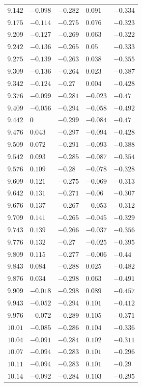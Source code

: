 \begin{table}[h]
\begin{tabular}{rllll}
$9.142$&$-0.098$&$-0.282$&$0.091$&$-0.334$\\
$9.175$&$-0.114$&$-0.275$&$0.076$&$-0.323$\\
$9.209$&$-0.127$&$-0.269$&$0.063$&$-0.322$\\
$9.242$&$-0.136$&$-0.265$&$0.05$&$-0.333$\\
$9.275$&$-0.139$&$-0.263$&$0.038$&$-0.355$\\
$9.309$&$-0.136$&$-0.264$&$0.023$&$-0.387$\\
$9.342$&$-0.124$&$-0.27$&$0.004$&$-0.428$\\
$9.376$&$-0.099$&$-0.281$&$-0.023$&$-0.47$\\
$9.409$&$-0.056$&$-0.294$&$-0.058$&$-0.492$\\
$9.442$&$0$&$-0.299$&$-0.084$&$-0.47$\\
$9.476$&$0.043$&$-0.297$&$-0.094$&$-0.428$\\
$9.509$&$0.072$&$-0.291$&$-0.093$&$-0.388$\\
$9.542$&$0.093$&$-0.285$&$-0.087$&$-0.354$\\
$9.576$&$0.109$&$-0.28$&$-0.078$&$-0.328$\\
$9.609$&$0.121$&$-0.275$&$-0.069$&$-0.313$\\
$9.642$&$0.131$&$-0.271$&$-0.06$&$-0.307$\\
$9.676$&$0.137$&$-0.267$&$-0.053$&$-0.312$\\
$9.709$&$0.141$&$-0.265$&$-0.045$&$-0.329$\\
$9.743$&$0.139$&$-0.266$&$-0.037$&$-0.356$\\
$9.776$&$0.132$&$-0.27$&$-0.025$&$-0.395$\\
$9.809$&$0.115$&$-0.277$&$-0.006$&$-0.44$\\
$9.843$&$0.084$&$-0.288$&$0.025$&$-0.482$\\
$9.876$&$0.034$&$-0.298$&$0.063$&$-0.491$\\
$9.909$&$-0.018$&$-0.298$&$0.089$&$-0.457$\\
$9.943$&$-0.052$&$-0.294$&$0.101$&$-0.412$\\
$9.976$&$-0.072$&$-0.289$&$0.105$&$-0.371$\\
$10.01$&$-0.085$&$-0.286$&$0.104$&$-0.336$\\
$10.04$&$-0.091$&$-0.284$&$0.102$&$-0.311$\\
$10.07$&$-0.094$&$-0.283$&$0.101$&$-0.296$\\
$10.11$&$-0.094$&$-0.283$&$0.101$&$-0.29$\\
$10.14$&$-0.092$&$-0.284$&$0.103$&$-0.295$\\

\end{tabular}
\end{table}
